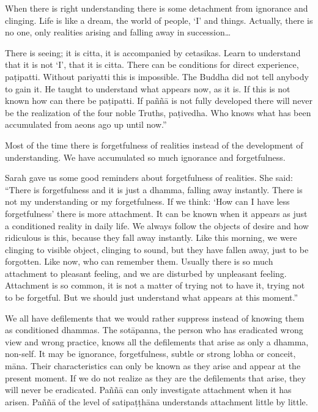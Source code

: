 When there is right understanding there is some detachment from
ignorance and clinging. Life is like a dream, the world of people, `I'
and things. Actually, there is no one, only realities arising and
falling away in succession\ldots{}

There is seeing; it is citta, it is accompanied by cetasikas. Learn to
understand that it is not `I', that it is citta. There can be conditions
for direct experience, paṭipatti. Without pariyatti this is impossible.
The Buddha did not tell anybody to gain it. He taught to understand what
appears now, as it is. If this is not known how can there be paṭipatti.
If paññā is not fully developed there will never be the realization of
the four noble Truths, paṭivedha. Who knows what has been accumulated
from aeons ago up until now.''

Most of the time there is forgetfulness of realities instead of the
development of understanding. We have accumulated so much ignorance and
forgetfulness.

Sarah gave us some good reminders about forgetfulness of realities. She
said: ``There is forgetfulness and it is just a dhamma, falling away
instantly. There is not my understanding or my forgetfulness. If we
think: `How can I have less forgetfulness' there is more attachment. It
can be known when it appears as just a conditioned reality in daily
life. We always follow the objects of desire and how ridiculous is this,
because they fall away instantly. Like this morning, we were clinging to
visible object, clinging to sound, but they have fallen away, just to be
forgotten. Like now, who can remember them. Usually there is so much
attachment to pleasant feeling, and we are disturbed by unpleasant
feeling. Attachment is so common, it is not a matter of trying not to
have it, trying not to be forgetful. But we should just understand what
appears at this moment.''

We all have defilements that we would rather suppress instead of knowing
them as conditioned dhammas. The sotāpanna, the person who has
eradicated wrong view and wrong practice, knows all the defilements that
arise as only a dhamma, non-self. It may be ignorance, forgetfulness,
subtle or strong lobha or conceit, māna. Their characteristics can only
be known as they arise and appear at the present moment. If we do not
realize as they are the defilements that arise, they will never be
eradicated. Paññā can only investigate attachment when it has arisen.
Paññā of the level of satipaṭṭhāna understands attachment little by
little.


